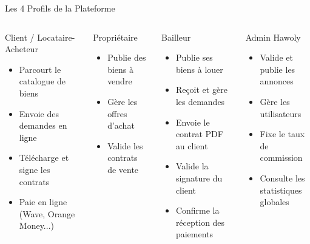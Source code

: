 ﻿\documentclass[aspectratio=169,10pt]{beamer}
\begin{document}
\begin{frame}{Les 4 Profils de la Plateforme}
\begin{columns}[T]
\begin{block}{\large Client / Locataire-Acheteur}
\begin{itemize}
\item Parcourt le catalogue de biens
\item Envoie des demandes en ligne
\item T\'{e}l\'{e}charge et signe les contrats
\item Paie en ligne (Wave, Orange Money...)
\end{itemize}
\end{block}
\vspace{0.2cm}
\begin{block}{\large Propri\'{e}taire}
\begin{itemize}
\item Publie des biens \`{a} vendre
\item G\`{e}re les offres d'achat
\item Valide les contrats de vente
\end{itemize}
\end{block}
\begin{block}{\large Bailleur}
\begin{itemize}
\item Publie ses biens \`{a} louer
\item Re\c{c}oit et g\`{e}re les demandes
\item Envoie le contrat PDF au client
\item Valide la signature du client
\item Confirme la r\'{e}ception des paiements
\end{itemize}
\end{block}
\vspace{0.2cm}
\begin{alertblock}{\large Admin Hawoly}
\begin{itemize}
\item Valide et publie les annonces
\item G\`{e}re les utilisateurs
\item Fixe le taux de commission
\item Consulte les statistiques globales
\end{itemize}
\end{alertblock}
\end{columns}
\end{frame}
\end{document}
